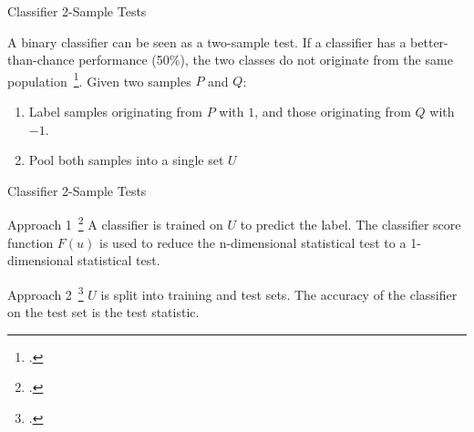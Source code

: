 \documentclass[10pt]{beamer}
\begin{document}

\begin{frame}{Classifier 2-Sample Tests}
    \begin{block}{}
        A binary classifier can be seen as a two-sample test.
        If a classifier has a better-than-chance performance (50\%), the two classes do not originate from the same
        population~\footcite{friedman2004multivariate}.
        \smallskip
        Given two samples $P$ and $Q$:
        \begin{enumerate}
            \item Label samples originating from $P$ with $1$, and those originating from $Q$ with $-1$.
            \item Pool both samples into a single set $U$
        \end{enumerate}
    \end{block}
\end{frame}

\begin{frame}{Classifier 2-Sample Tests}
    \begin{block}{Approach 1~\footcite{friedman2004multivariate}}
        A classifier is trained on $U$ to predict the label. The classifier score function $F(u)$ is used
        to reduce the n-dimensional statistical test to a 1-dimensional statistical test.
    \end{block}
    \begin{block}{Approach 2~\footcite{lopez2016revisiting}}
        $U$ is split into training and test sets. The accuracy of the classifier on the test set is the test statistic.
    \end{block}

\end{frame}
\end{document}
